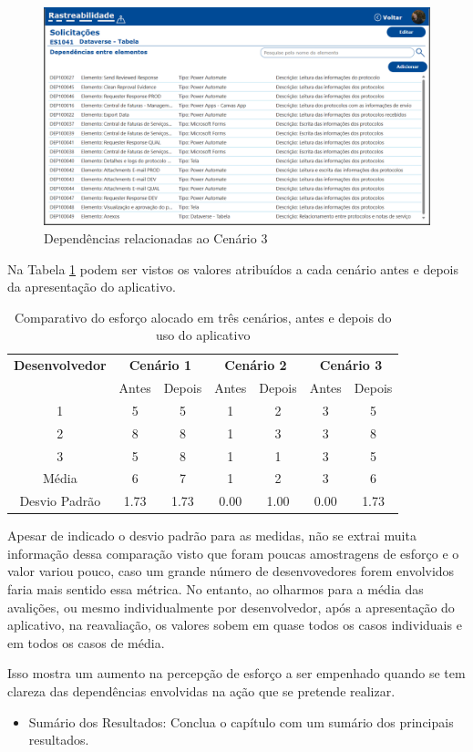 	\begin{figure}[!h]
		\centering
		\includegraphics[width=1\textwidth]{./figuras/solicitacoesTabela.png}
		\caption{Dependências relacionadas ao Cenário 3}
		\label{fig:resultados:solicitacoesTabela}
	\end{figure}

	Na Tabela \ref{tab:cenarios_desenvolvimento} podem ser vistos os valores atribuídos a cada cenário antes e depois da apresentação do aplicativo.

	\begin{table}[!htb]
		\centering
		\begin{tabular}{c cc cc cc}
			\toprule
			\textbf{Desenvolvedor} & \multicolumn{2}{c}{\textbf{Cenário 1}} & \multicolumn{2}{c}{\textbf{Cenário 2}} & \multicolumn{2}{c}{\textbf{Cenário 3}} \\
			& Antes & Depois & Antes & Depois & Antes & Depois \\
			\midrule
			1 & 5 & 5 & 1 & 2 & 3 & 5 \\
			2 & 8 & 8 & 1 & 3 & 3 & 8 \\
			3 & 5 & 8 & 1 & 1 & 3 & 5 \\
			\midrule
			Média & 6 & 7 & 1 & 2 & 3 & 6 \\
			Desvio Padrão & 1.73 & 1.73 & 0.00 & 1.00 & 0.00 & 1.73 \\
			\bottomrule
		\end{tabular}
		\caption{Comparativo do esforço alocado em três cenários, antes e depois do uso do aplicativo}
		\label{tab:cenarios_desenvolvimento}
	\end{table}

	Apesar de indicado o desvio padrão para as medidas, não se extrai muita informação dessa comparação visto que foram poucas amostragens de esforço e o valor variou pouco,
	caso um grande número de desenvovedores forem envolvidos faria mais sentido essa métrica. No entanto, ao olharmos para a média das avalições, ou mesmo individualmente por
	desenvolvedor, após a apresentação do aplicativo, na reavaliação, os valores sobem em quase todos os casos individuais e em todos os casos de média.

	Isso mostra um aumento na percepção de esforço a ser empenhado quando se tem clareza das dependências envolvidas na ação que se pretende realizar.

	
	\begin{itemize}		
		\item Sumário dos Resultados: Conclua o capítulo com um sumário dos principais resultados.
	\end{itemize}